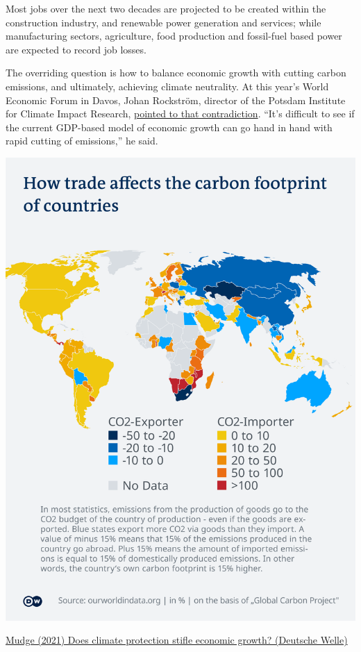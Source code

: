 \documentclass[
]{book}
\begin{document}
Most jobs over the next two decades are projected to be created within the construction industry, and renewable power generation and services; while manufacturing sectors, agriculture, food production and fossil-fuel based power are expected to record job losses.

The overriding question is how to balance economic growth with cutting carbon emissions, and ultimately, achieving climate neutrality. At this year's World Economic Forum in Davos, Johan Rockström, director of the Potsdam Institute for Climate Impact Research,
\href{https://www.nytimes.com/2020/01/21/climate/greta-thunberg-trump-davos.html}{pointed to that contradiction}. ``It's difficult to see if the current GDP-based model of economic growth can go hand in hand with rapid cutting of emissions,'' he said.

\includegraphics{fig/trade_carbon_footprint.png}

\href{https://www.dw.com/en/fact-check-does-climate-protection-stifle-economic-growth/a-58104531}{Mudge (2021) Does climate protection stifle economic growth? (Deutsche Welle)}
\end{document}
